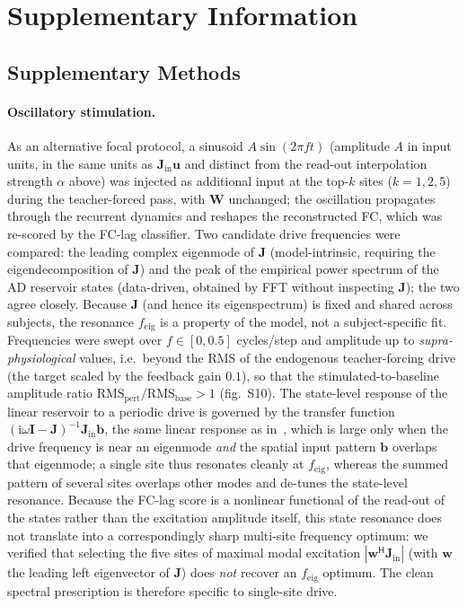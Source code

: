 \documentclass[11pt]{article}
\newcommand{\beginsupplement}{%
  \setcounter{table}{0}\renewcommand{\thetable}{S\arabic{table}}%
  \setcounter{figure}{0}\renewcommand{\thefigure}{S\arabic{figure}}}
\begin{document}
\clearpage
\beginsupplement
\section*{Supplementary Information}
\subsection*{Supplementary Methods}
\paragraph{Oscillatory stimulation.}
As an alternative focal protocol, a sinusoid $A\sin(2\pi f t)$ (amplitude $A$ in
input units, in the same units as $\mathbf{J}_{\mathrm{in}}\mathbf{u}$ and
distinct from the read-out interpolation strength $\alpha$ above) was injected as
additional input at the top-$k$ sites ($k=1,2,5$) during the teacher-forced
pass, with $\mathbf{W}$ unchanged; the oscillation propagates through the
recurrent dynamics and reshapes the reconstructed FC, which was re-scored by the
FC-lag classifier. Two candidate drive frequencies were compared: the leading
complex eigenmode of $\mathbf{J}$ (model-intrinsic, requiring the eigendecomposition
of $\mathbf{J}$) and the peak of the empirical power spectrum of the AD reservoir
states (data-driven, obtained by FFT without inspecting $\mathbf{J}$); the two
agree closely. Because $\mathbf{J}$ (and hence its eigenspectrum) is fixed and
shared across subjects, the resonance $f_{\mathrm{eig}}$ is a property of the model,
not a subject-specific fit. Frequencies were swept over $f\in[0,0.5]$ cycles/step
and amplitude up to \emph{supra-physiological} values, i.e.\ beyond the RMS of
the endogenous teacher-forcing drive (the target scaled by the feedback gain
$0.1$), so that the stimulated-to-baseline amplitude ratio
$\mathrm{RMS}_{\mathrm{pert}}/\mathrm{RMS}_{\mathrm{base}}>1$ (fig.~S10).
The state-level response of the linear
reservoir to a periodic drive is governed by the transfer function
$(\mathrm{i}\omega\mathbf{I}-\mathbf{J})^{-1}\mathbf{J}_{\mathrm{in}}\mathbf{b}$,
the same linear response as in~\cite{diantonio2026},
which is large only when the drive frequency is near an eigenmode \emph{and} the
spatial input pattern $\mathbf{b}$ overlaps that eigenmode; a single site thus
resonates cleanly at $f_{\mathrm{eig}}$, whereas the summed pattern of several
sites overlaps other modes and de-tunes the state-level resonance. Because the
FC-lag score is a nonlinear functional of the read-out of the states rather than
the excitation amplitude itself, this state resonance does not translate into a
correspondingly sharp multi-site frequency optimum: we verified that selecting
the five sites of maximal modal excitation
$|\mathbf{w}^{\mathsf H}\mathbf{J}_{\mathrm{in}}|$ (with $\mathbf{w}$ the leading
left eigenvector of $\mathbf{J}$) does \emph{not} recover an $f_{\mathrm{eig}}$
optimum. The clean spectral prescription is therefore specific to single-site
drive.
\end{document}
